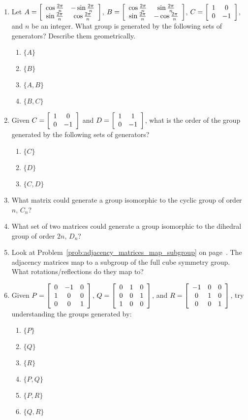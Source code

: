 \documentclass[../gatm.tex]{subfiles}
\begin{document}
\begin{enumerate}
\item Let $A=\left[\begin{array}{cc} \cos\frac{2\pi}{n} & -\sin\frac{2\pi}{n} \\ \sin\frac{2\pi}{n} & \cos\frac{2\pi}{n} \end{array}\right]$, $B=\left[\begin{array}{cc} \cos\frac{2\pi}{n} & \sin\frac{2\pi}{n} \\ \sin\frac{2\pi}{n} & -\cos\frac{2\pi}{n} \end{array}\right]$, $C=\left[\begin{array}{cc} 1 & 0 \\ 0 & -1 \end{array}\right]$, and $n$ be an integer. What group is generated by the following sets of generators? Describe them geometrically.
\begin{multicols}{4}
\begin{enumerate}
\item $\{A\}$
\item $\{B\}$
\item $\{A,B\}$
\item $\{B,C\}$
\end{enumerate}
\end{multicols}
\item Given $C=\left[\begin{array}{cc} 1 & 0 \\ 0 & -1 \end{array}\right]$ and $D=\left[\begin{array}{cc} 1 & 1 \\ 0 & -1 \end{array}\right]$, what is the order of the group generated by the following sets of generators?
\begin{multicols}{3}
\begin{enumerate}
\item $\{C\}$
\item $\{D\}$
\item $\{C,D\}$
\end{enumerate}
\end{multicols}
\item What matrix could generate a group isomorphic to the cyclic group of order $n$, $C_n$?
\item What set of two matrices could generate a group isomorphic to the dihedral group of order $2n$, $D_n$?
\item Look at Problem~\ref{prob:adjacency_matrices_map_subgroup} on page~\pageref{prob:adjacency_matrices_map_subgroup}. The adjacency matrices map to a subgroup of the full cube symmetry group. What rotations/reflections do they map to?
\item Given $P=\left[\begin{array}{ccc} 0 & -1 & 0 \\ 1 & 0 & 0 \\ 0 & 0 & 1 \end{array}\right]$, $Q=\left[\begin{array}{ccc} 0 & 1 & 0 \\ 0 & 0 & 1 \\ 1 & 0 & 0 \end{array}\right]$, and $R=\left[\begin{array}{ccc} -1 & 0 & 0 \\ 0 & 1 & 0 \\ 0 & 0 & 1 \end{array}\right]$, try understanding the groups generated by:
\begin{multicols}{4}
\begin{enumerate}
\item $\{P\}$
\item $\{Q\}$
\item $\{R\}$
\item $\{P,Q\}$
\item $\{P,R\}$
\item $\{Q,R\}$

\end{enumerate}
\end{multicols}
\end{enumerate}
\end{document}

